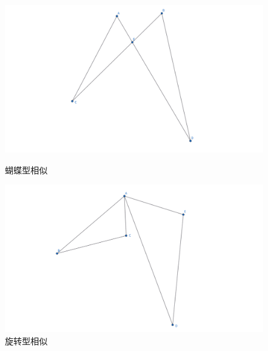 \begin{figure}[H]
    \centering
    \hfill %
    \begin{minipage}[t]{0.45\textwidth}
    \centering
    \includegraphics[width=0.8\linewidth]{figures/蝴蝶型相似.png}
    \caption{蝴蝶型相似}
    \end{minipage}
    \hfill %
    \begin{minipage}[t]{0.45\textwidth}
    \centering
    \includegraphics[width=0.8\linewidth]{figures/旋转型相似.png}
    \caption{旋转型相似}
    \end{minipage}
\end{figure}


